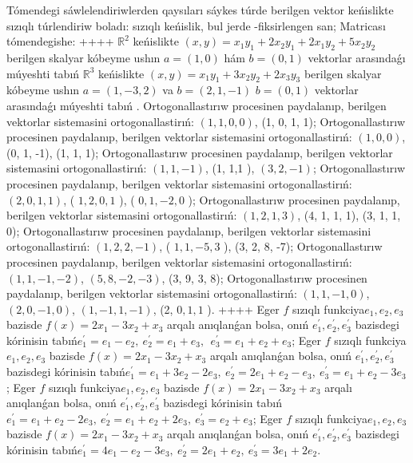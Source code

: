 Tómendegi sáwlelendiriwlerden qaysıları sáykes túrde berilgen vektor keńislikte sızıqlı túrlendiriw boladı: sızıqlı keńislik, bul jerde -fiksirlengen san;
Matricası tómendegishe:
++++
\(\mathbb{R}^{2}\) keńislikte \((x,y) = x_{1}y_{1} + 2x_{2}y_{1} + 2x_{1}y_{2} + 5x_{2}y_{2}\) berilgen skalyar kóbeyme ushın \(a = (1,0)\) hám \(b = (0,1)\) vektorlar arasındaǵı múyeshti tabıń
\(\mathbb{R}^{3}\) keńislikte \((x,y) = x_{1}y_{1} + 3x_{2}y_{2} + 2x_{3}y_{3}\) berilgen skalyar kóbeyme ushın \(a = (1, - 3,2)\) va \(b = (2,1, - 1)\) \(b = (0,1)\) vektorlar arasındaǵı múyeshti tabıń .
Ortogonallastırıw procesinen paydalanıp, berilgen vektorlar sistemasini ortogonallastirıń: \((1,1,0,0)\), (1, 0, 1, 1);
Ortogonallastırıw procesinen paydalanıp, berilgen vektorlar sistemasini ortogonallastirıń: \((1,0,0)\), (0, 1, -1), (1, 1, 1);
Ortogonallastırıw procesinen paydalanıp, berilgen vektorlar sistemasini ortogonallastirıń: \((1,1, - 1)\), (1, 1,1 ), \((3,2, - 1)\);
Ortogonallastırıw procesinen paydalanıp, berilgen vektorlar sistemasini ortogonallastirıń: \((2,0,1,1)\), ( \(1,2,0,1\) ), ( \(0,1, - 2,0\) );
Ortogonallastırıw procesinen paydalanıp, berilgen vektorlar sistemasini ortogonallastirıń: \((1,2,1,3)\), (4, 1, 1, 1), (3, 1, 1, 0);
Ortogonallastırıw procesinen paydalanıp, berilgen vektorlar sistemasini ortogonallastirıń: \((1,2,2, - 1)\), ( \(1,1, - 5,3\) ), (3, 2, 8, -7);
Ortogonallastırıw procesinen paydalanıp, berilgen vektorlar sistemasini ortogonallastirıń: \((1,1, - 1, - 2)\), \((5,8, - 2, - 3)\), (3, 9, 3, 8);
Ortogonallastırıw procesinen paydalanıp, berilgen vektorlar sistemasini ortogonallastirıń: \((1,1, - 1,0)\), \((2,0, - 1,0)\), \((1, - 1,1, - 1)\), (2, \(0,1,1\) ).
++++
Eger \(f\) sızıqlı funkciya\(e_{1},e_{2},e_{3}\) bazisde \(f(x) = 2x_{1} - 3x_{2} + x_{3}\) arqalı anıqlanǵan bolsa, onıń \(e_{1}^{'},e_{2}^{'},e_{3}^{'}\) bazisdegi kórinisin tabıń\(e_{1}^{'} = e_{1} - e_{2},\ e_{2}^{'} = e_{1} + e_{3},\ \ e_{3}^{'} = e_{1} + e_{2} + e_{3}\);
Eger \(f\) sızıqlı funkciya\(e_{1},e_{2},e_{3}\) bazisde \(f(x) = 2x_{1} - 3x_{2} + x_{3}\) arqalı anıqlanǵan bolsa, onıń \(e_{1}^{'},e_{2}^{'},e_{3}^{'}\) bazisdegi kórinisin tabıń\(e_{1}^{'} = e_{1} + 3e_{2} - 2e_{3},\ e_{2}^{'} = 2e_{1} + e_{2} - e_{3},\ e_{3}^{'} = e_{1} + e_{2} - 3e_{3}\);
Eger \(f\) sızıqlı funkciya\(e_{1},e_{2},e_{3}\) bazisde \(f(x) = 2x_{1} - 3x_{2} + x_{3}\) arqalı anıqlanǵan bolsa, onıń \(e_{1}^{'},e_{2}^{'},e_{3}^{'}\) bazisdegi kórinisin tabıń\(e_{1}^{'} = e_{1} + e_{2} - 2e_{3},\ e_{2}^{'} = e_{1} + e_{2} + 2e_{3},\ e_{3}^{'} = e_{2} + e_{3}\);
Eger \(f\) sızıqlı funkciya\(e_{1},e_{2},e_{3}\) bazisde \(f(x) = 2x_{1} - 3x_{2} + x_{3}\) arqalı anıqlanǵan bolsa, onıń \(e_{1}^{'},e_{2}^{'},e_{3}^{'}\) bazisdegi kórinisin tabıń\(e_{1}^{'} = 4e_{1} - e_{2} - 3e_{3},\ e_{2}^{'} = 2e_{1} + e_{2},\ e_{3}^{'} = 3e_{1} + 2e_{2}\).
